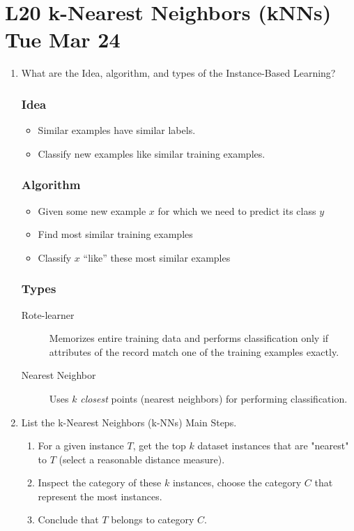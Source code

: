 \documentclass[12pt]{article}
\newenvironment{QandA}{\begin{enumerate}[label=\bfseries\arabic*.]\bfseries}
{\end{enumerate}}
\newenvironment{answered}{\par\normalfont\color{Sepia}}{}
\begin{document}
\section*{L20 k-Nearest Neighbors (kNNs) \textemdash{} Tue Mar 24}
\begin{QandA}
    \item What are the Idea, algorithm, and types of the Instance-Based Learning?
    \begin{answered}
        \subsubsection*{Idea}
        \begin{itemize}
            \item Similar examples have similar labels.
            \item Classify new examples like similar training examples.
        \end{itemize}
        \subsubsection*{Algorithm}
        \begin{itemize}
            \item Given some new example $x$ for which we need to predict its class $y$
            \item Find most similar training examples
            \item Classify $x$ “like” these most similar examples
        \end{itemize}
        \subsubsection*{Types}
        \begin{description}
            \item[Rote-learner] Memorizes entire training data and performs classification 
                                only if attributes of the record match one of the training examples exactly.
            \item[Nearest Neighbor] Uses $k$ \textit{closest} points (nearest neighbors) for performing classification.
        \end{description}
    \end{answered}

    \item List the k-Nearest Neighbors (k-NNs) Main Steps.
    \begin{answered}
        \begin{enumerate}
            \item For a given instance $T$, get the top $k$ dataset instances that are "nearest" to $T$ (select a reasonable distance measure).
            \item Inspect the category of these $k$ instances, choose the category $C$ that represent the most instances.
            \item Conclude that $T$ belongs to category $C$.
        \end{enumerate}
    \end{answered}


\end{QandA}
\end{document}
